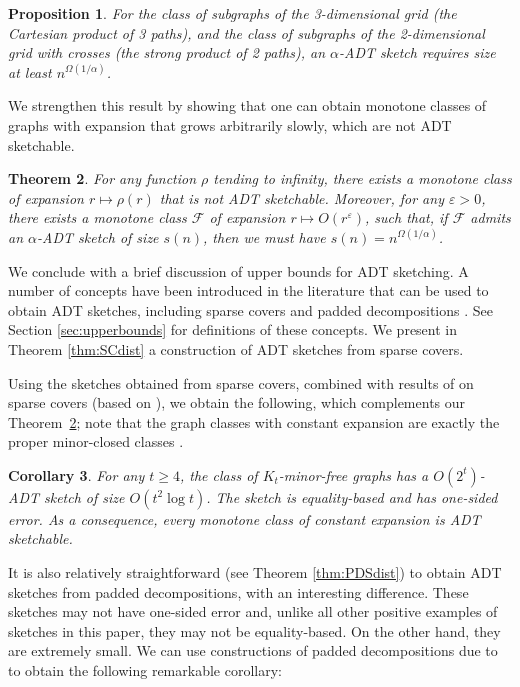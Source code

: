 \documentclass[11pt]{article}
\newtheorem{thm}{Theorem}[section]
\newtheorem{proposition}[thm]{Proposition}
\newtheorem{corollary}[thm]{Corollary}
\theoremstyle{definition}
\newcommand{\eps}{\varepsilon}
\renewcommand{\geq}{\geqslant}
\def\F {{\mathcal F}}
\begin{document}
\begin{proposition}
For the class of subgraphs of the 3-dimensional grid (the Cartesian product of 3 paths), and the
class of subgraphs of the 2-dimensional grid with crosses (the strong product of 2 paths), an $\alpha$-ADT sketch
requires size at least $n^{\Omega(1/\alpha)}$.
\end{proposition}

\noindent
We strengthen this result by showing that one can obtain monotone classes of graphs with expansion
that grows arbitrarily slowly, which are not ADT sketchable.

\begin{thm}
\label{thm:intro small expansion}
For any function $\rho$ tending to infinity, there exists a monotone class of expansion $r \mapsto
\rho(r)$ that is not ADT sketchable.  Moreover, for any $\eps>0$, there exists a monotone class
$\F$ of expansion $r\mapsto O(r^\eps)$, such that, if $\F$ admits an $\alpha$-ADT sketch of size
$s(n)$, then we must have $s(n) = n^{\Omega(1/\alpha)}$.
\end{thm}

\noindent
We conclude with a brief discussion of upper bounds for ADT sketching. A number of concepts have
been introduced in the literature that can be used to obtain ADT
sketches, including
sparse covers \cite{AP90} and padded decompositions \cite{KPR93}.
See Section \ref{sec:upperbounds} for definitions of these
concepts. We present in Theorem \ref{thm:SCdist} a construction of ADT sketches from sparse covers.

 
Using the sketches obtained from sparse covers, combined with results of \cite{Fil20} on sparse
covers (based on \cite{KPR93,FT03}), we obtain the following, which complements our
Theorem~\ref{thm:intro small expansion}; note that the graph classes with constant expansion are
exactly the proper minor-closed classes \cite{NO12}.
\begin{corollary}
For any $t \geq 4$, the class of $K_t$-minor-free graphs has a $O(2^t)$-ADT sketch of size $O(t^2 \log
t)$. The sketch is equality-based and has one-sided error. As a consequence, every monotone class of
constant expansion is ADT sketchable.
\end{corollary}
\noindent
It is also relatively straightforward (see Theorem \ref{thm:PDSdist}) to obtain
ADT sketches from padded decompositions, with an interesting difference. These sketches may not have
one-sided error and, unlike all other positive examples of sketches in this paper, they may not be
equality-based. On the other hand, they are extremely small. We can use constructions of padded
decompositions due to \cite{LS10,AGGNT19} to obtain the following remarkable corollary:
\end{document}
